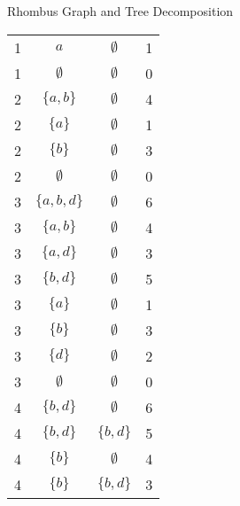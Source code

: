 \documentclass{beamer}
\begin{document}
\begin{frame}{Rhombus Graph and Tree Decomposition}
\begin{minipage}{0.35\textwidth}
\begin{tabular}{|c| >{\small}c | >{\small}c | >{\small}c |}
    \hline
    1 & \( a \) & \( \emptyset \) & 1 \\
    1 & \( \emptyset \) & \( \emptyset \) & 0 \\
    \hline
    2 & \( \{ a, b \} \) & \( \emptyset \) & 4 \\
    2 & \( \{ a \} \) & \( \emptyset \) & 1 \\
    2 & \( \{ b \} \) & \( \emptyset \) & 3 \\
    2 & \( \emptyset \) & \( \emptyset \) & 0 \\
    \hline
    3 & \( \{ a, b, d \} \) & \( \emptyset \) & 6 \\
    3 & \( \{ a, b \} \) & \( \emptyset \) & 4 \\
    3 & \( \{ a, d \} \) & \( \emptyset \) & 3 \\
    3 & \( \{ b, d \} \) & \( \emptyset \) & 5 \\
    3 & \( \{ a \} \) & \( \emptyset \) & 1 \\
    3 & \( \{ b \} \) & \( \emptyset \) & 3 \\
    3 & \( \{ d \} \) & \( \emptyset \) & 2 \\
    3 & \( \emptyset \) & \( \emptyset \) & 0 \\
    \hline
    4 & \( \{ b, d \} \) & \( \emptyset \) & 6 \\
    4 & \( \{ b, d \} \) & \( \{ b, d \} \) & 5 \\
    4 & \( \{ b \} \) & \( \emptyset \) & 4 \\
    4 & \( \{ b \} \) & \( \{ b, d \} \) & 3 \\


\end{tabular}
\end{minipage}
\end{frame}
\end{document}

